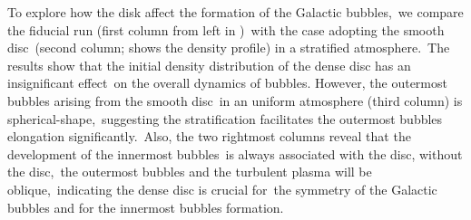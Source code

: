 \documentclass[twocolumn]{aastex631}
\begin{document}
 To explore how the disk affect the formation of the Galactic bubbles,\
 we compare the fiducial run (first column from left in )\
 with the case adopting the smooth disc\
 (second column;  shows the density profile) in a stratified atmosphere.\
 The results show that the initial density distribution of the dense disc has an insignificant effect\
 on the overall dynamics of bubbles. However, the outermost bubbles arising from the smooth disc\
 in an uniform atmosphere (third column) is spherical-shape,\
 suggesting the stratification facilitates the outermost bubbles elongation significantly.\
 Also, the two rightmost columns reveal that the development of the innermost bubbles\
 is always associated with the disc, without the disc,\
 the outermost bubbles and the turbulent plasma will be oblique,\
 indicating the dense disc is crucial for\
 the symmetry of the Galactic bubbles and for the innermost bubbles formation.
\end{document}

